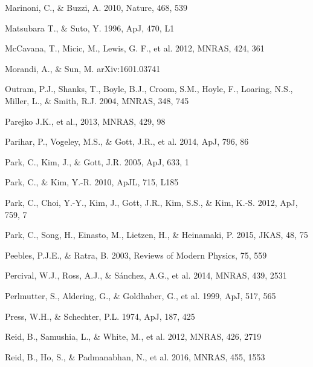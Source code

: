 \documentclass[iop]{emulateapj}
\begin{document}
\begin{thebibliography}{}
Marinoni, C., \& Buzzi, A. 2010, Nature, 468, 539  

Matsubara T., \& Suto, Y. 1996, ApJ, 470, L1  

McCavana, T., Micic, M., Lewis, G. F., et al. 2012, MNRAS, 424, 361


Morandi, A., \& Sun, M. arXiv:1601.03741


Outram, P.J., Shanks, T., Boyle, B.J., Croom, S.M., Hoyle, F., Loaring, N.S., 
Miller, L., \& Smith, R.J. 2004, MNRAS, 348, 745  


Parejko J.K., et al., 2013, MNRAS, 429, 98

Parihar, P., Vogeley, M.S., \& Gott, J.R., et al. 2014, ApJ, 796, 86

Park, C., Kim, J., \& Gott, J.R. 2005, ApJ, 633, 1  

Park, C., \& Kim, Y.-R. 2010, ApJL, 715, L185  

Park, C., Choi, Y.-Y., Kim, J., Gott, J.R., Kim, S.S., \&
Kim, K.-S. 2012, ApJ, 759, 7

Park, C., Song, H., Einasto, M., Lietzen, H., \&
Heinamaki, P. 2015, JKAS, 48, 75

Peebles, P.J.E., \& Ratra, B. 2003, Reviews of Modern Physics, 75, 559

Percival, W.J., Ross, A.J., \& S\'{a}nchez, A.G., et al. 2014, MNRAS, 439, 2531

Perlmutter, S., Aldering, G., \& Goldhaber, G., et al. 1999, ApJ, 517, 565  

Press, W.H., \& Schechter, P.L. 1974, ApJ, 187, 425

Reid, B., Samushia, L., \& White, M., et al. 2012, MNRAS, 426, 2719  

Reid, B., Ho, S., \& Padmanabhan, N., et al.  2016, MNRAS, 455, 1553


\end{thebibliography}
\end{document}
